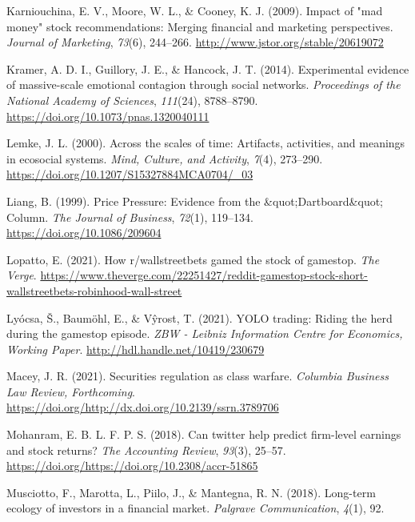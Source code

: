 \documentclass[12pt,]{article}
\begin{document}
\leavevmode\hypertarget{ref-karniouchina2009}{}%
Karniouchina, E. V., Moore, W. L., \& Cooney, K. J. (2009). Impact of
"mad money" stock recommendations: Merging financial and marketing
perspectives. \emph{Journal of Marketing}, \emph{73}(6), 244--266.
\url{http://www.jstor.org/stable/20619072}

\leavevmode\hypertarget{ref-kramer2014}{}%
Kramer, A. D. I., Guillory, J. E., \& Hancock, J. T. (2014).
Experimental evidence of massive-scale emotional contagion through
social networks. \emph{Proceedings of the National Academy of Sciences},
\emph{111}(24), 8788--8790.
\url{https://doi.org/10.1073/pnas.1320040111}

\leavevmode\hypertarget{ref-lemke}{}%
Lemke, J. L. (2000). Across the scales of time: Artifacts, activities,
and meanings in ecosocial systems. \emph{Mind, Culture, and Activity},
\emph{7}(4), 273--290.
\url{https://doi.org/10.1207/S15327884MCA0704/_03}

\leavevmode\hypertarget{ref-liang1999}{}%
Liang, B. (1999). Price Pressure: Evidence from the
\&quot;Dartboard\&quot; Column. \emph{The Journal of Business},
\emph{72}(1), 119--134. \url{https://doi.org/10.1086/209604}

\leavevmode\hypertarget{ref-lopatto2021}{}%
Lopatto, E. (2021). How r/wallstreetbets gamed the stock of gamestop.
\emph{The Verge}.
\url{https://www.theverge.com/22251427/reddit-gamestop-stock-short-wallstreetbets-robinhood-wall-street}

\leavevmode\hypertarget{ref-lyocsa2021}{}%
Lyócsa, Š., Baumöhl, E., \& Vŷrost, T. (2021). YOLO trading: Riding the
herd during the gamestop episode. \emph{ZBW - Leibniz Information Centre
for Economics, Working Paper}. \url{http://hdl.handle.net/10419/230679}

\leavevmode\hypertarget{ref-macey2021}{}%
Macey, J. R. (2021). Securities regulation as class warfare.
\emph{Columbia Business Law Review, Forthcoming}.
\url{https://doi.org/http://dx.doi.org/10.2139/ssrn.3789706}

\leavevmode\hypertarget{ref-bartov2018}{}%
Mohanram, E. B. L. F. P. S. (2018). Can twitter help predict firm-level
earnings and stock returns? \emph{The Accounting Review}, \emph{93}(3),
25--57. \url{https://doi.org/https://doi.org/10.2308/accr-51865}

\leavevmode\hypertarget{ref-musciotto2018}{}%
Musciotto, F., Marotta, L., Piilo, J., \& Mantegna, R. N. (2018).
Long-term ecology of investors in a financial market. \emph{Palgrave
Communication}, \emph{4}(1), 92.
\end{document}
